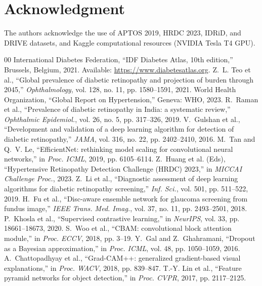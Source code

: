 \documentclass[conference]{IEEEtran}
\begin{document}
\section*{Acknowledgment}

The authors acknowledge the use of APTOS 2019, HRDC 2023, IDRiD, and DRIVE datasets, and Kaggle computational resources (NVIDIA Tesla T4 GPU).

\begin{thebibliography}{00}
 International Diabetes Federation, ``IDF Diabetes Atlas, 10th edition,'' Brussels, Belgium, 2021. Available: \url{https://www.diabetesatlas.org}.
 Z.~L. Teo et al., ``Global prevalence of diabetic retinopathy and projection of burden through 2045,'' \textit{Ophthalmology}, vol. 128, no. 11, pp. 1580--1591, 2021.
 World Health Organization, ``Global Report on Hypertension,'' Geneva: WHO, 2023.
 R.~Raman et al., ``Prevalence of diabetic retinopathy in India: a systematic review,'' \textit{Ophthalmic Epidemiol.}, vol. 26, no. 5, pp. 317--326, 2019.
 V.~Gulshan et al., ``Development and validation of a deep learning algorithm for detection of diabetic retinopathy,'' \textit{JAMA}, vol. 316, no. 22, pp. 2402--2410, 2016.
 M.~Tan and Q.~V. Le, ``EfficientNet: rethinking model scaling for convolutional neural networks,'' in \textit{Proc. ICML}, 2019, pp. 6105--6114.
 Z.~Huang et al. (Eds), ``Hypertensive Retinopathy Detection Challenge (HRDC) 2023,'' in \textit{MICCAI Challenge Proc.}, 2023.
 Z.~Li et al., ``Diagnostic assessment of deep learning algorithms for diabetic retinopathy screening,'' \textit{Inf. Sci.}, vol. 501, pp. 511--522, 2019.
 H.~Fu et al., ``Disc-aware ensemble network for glaucoma screening from fundus image,'' \textit{IEEE Trans. Med. Imag.}, vol. 37, no. 11, pp. 2493--2501, 2018.
 P.~Khosla et al., ``Supervised contrastive learning,'' in \textit{NeurIPS}, vol. 33, pp. 18661--18673, 2020.
 S.~Woo et al., ``CBAM: convolutional block attention module,'' in \textit{Proc. ECCV}, 2018, pp. 3--19.
 Y.~Gal and Z.~Ghahramani, ``Dropout as a Bayesian approximation,'' in \textit{Proc. ICML}, vol. 48, pp. 1050--1059, 2016.
 A.~Chattopadhyay et al., ``Grad-CAM++: generalized gradient-based visual explanations,'' in \textit{Proc. WACV}, 2018, pp. 839--847.
 T.-Y. Lin et al., ``Feature pyramid networks for object detection,'' in \textit{Proc. CVPR}, 2017, pp. 2117--2125.

\end{thebibliography}
\end{document}
